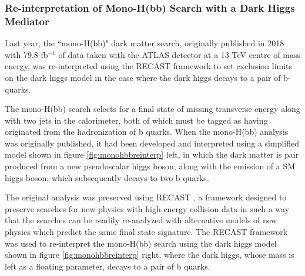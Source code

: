\documentclass[12pt]{article}
\begin{document}
\subsubsection{Re-interpretation of Mono-H(bb) Search with a Dark Higgs Mediator}

Last year, the ``mono-H(bb)" dark matter search, originally published in 2018 \cite{monohbb} with 79.8 fb$^{-1}$ of data taken with the ATLAS detector at a 13 TeV centre of mass energy, was re-interpreted \cite{monohbb_recast} using the RECAST framework \cite{recast} to set exclusion limits on the dark higgs model in the case where the dark higgs decays to a pair of b-quarks. 

The mono-H(bb) search selects for a final state of missing transverse energy along with two jets in the calorimeter, both of which must be tagged as having originated from the hadronization of b quarks. When the mono-H(bb) analysis was originally published, it had been developed and interpreted using a simplified model shown in figure \ref{fig:monohbbreinterp} left, in which the dark matter is pair produced from a new pseudoscalar higgs boson, along with the emission of a SM higgs boson, which subsequently decays to two b quarks.  

The original analysis was preserved using RECAST \cite{recast}, a framework designed to preserve searches for new physics with high energy collision data in such a way that the searches can be readily re-analyzed with alternative models of new physics which predict the same final state signature. The RECAST framework was used to re-interpret the mono-H(bb) search using the dark higgs model shown in figure \ref{fig:monohbbreinterp} right, where the dark higgs, whose mass is left as a floating parameter, decays to a pair of b quarks. 
\end{document}
